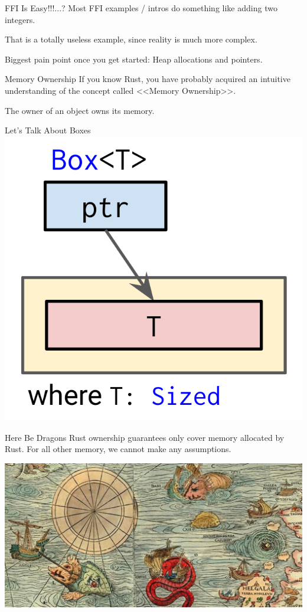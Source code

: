 \documentclass[aspectratio=1610,14pt,t]{beamer}
\begin{document}
\begin{frame}[c]{FFI Is Easy!!!...?}
  Most FFI examples / intros do something like adding two integers.

  That is a totally useless example, since reality is much more complex.

  Biggest pain point once you get started: Heap allocations and pointers.
\end{frame}

\begin{frame}[c]{Memory Ownership}
  If you know Rust, you have probably acquired an intuitive understanding of the
  concept called <<Memory Ownership>>.

  The owner of an object owns its memory.
\end{frame}

\begin{frame}[c]{Let's Talk About Boxes}
  \centering
  \includegraphics[width=.5\textwidth]{img/box.png}
\end{frame}

\begin{frame}[c]{Here Be Dragons}
    Rust ownership guarantees only cover memory allocated by Rust. For all
    other memory, we cannot make any assumptions.

  \includegraphics[width=\textwidth]{img/dragons.jpg}
\end{frame}
\end{document}
